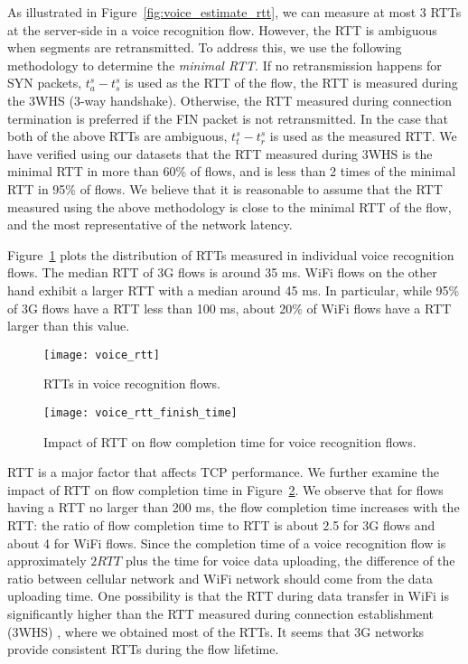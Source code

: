 As illustrated in Figure~\ref{fig:voice_estimate_rtt}, we can measure at most 3 RTTs at the server-side in a voice recognition flow. However, the RTT is ambiguous when segments are retransmitted. To address this, we use the following methodology to determine the \emph{minimal RTT}. If no retransmission happens for SYN packets, $t^s_a - t^s_s$ is used as the RTT of the flow, \ie the RTT is measured during the 3WHS (3-way handshake). Otherwise, the RTT measured during connection termination is preferred if the FIN packet is not retransmitted. In the case that both of the above RTTs are ambiguous, $t^s_t - t^s_r$ is used as the measured RTT. We have verified using our datasets that the RTT measured during 3WHS is the minimal RTT in more than 60\% of flows, and is less than 2 times of the minimal RTT in 95\% of flows. We believe that it is reasonable to assume that the RTT measured using the above methodology is close to the minimal RTT of the flow, and the most representative of the network latency.

Figure~\ref{fig:voice_rtt} plots the distribution of RTTs measured in individual voice recognition flows. The median RTT of 3G flows is around 35 ms. WiFi flows on the other hand exhibit a larger RTT with a median around 45 ms. In particular, while 95\% of 3G flows have a RTT less than 100 ms, about 20\% of WiFi flows have a RTT larger than this value.

\begin{figure}[th]
\centering
	\texttt{[image: voice\_rtt]}
\caption{RTTs in voice recognition flows.}
\label{fig:voice_rtt}
\end{figure}

\begin{figure}[th]
\centering
	\texttt{[image: voice\_rtt\_finish\_time]}
\caption{Impact of RTT on flow completion time for voice recognition flows.}
\label{fig:v_rtt_time}
\end{figure}

RTT is a major factor that affects TCP performance. We further examine the impact of RTT on flow completion time in Figure~\ref{fig:v_rtt_time}. We observe that for flows having a RTT no larger than 200 ms, the flow completion time increases with the RTT: the ratio of flow completion time to RTT is about 2.5 for 3G flows and about 4 for WiFi flows. Since the completion time of a voice recognition flow is approximately $2RTT$ plus the time for voice data uploading, the difference of the ratio between cellular network and WiFi network should come from the data uploading time. One possibility is that the RTT during data transfer in WiFi is significantly higher than the RTT measured during connection establishment (\ie 3WHS) \cite{UM-CS-2012-022}, where we obtained most of the RTTs. It seems that 3G networks provide consistent RTTs during the flow lifetime.

